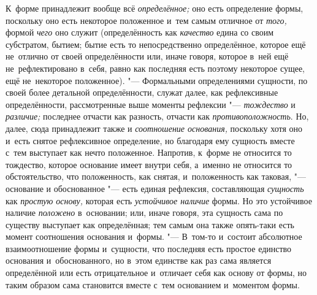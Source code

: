 К~форме принадлежит вообще всё {\em определённое;} оно есть определение формы,
поскольку оно есть некоторое положенное и~тем самым отличное от {\em того,}
формой {\em чего} оно служит (определённость как {\em качество} едина со своим
субстратом, бытием; бытие есть то непосредственно определённое, которое ещё
не~отлично от своей определённости или, иначе говоря, которое в~ней ещё
не~рефлектировано в~себя, равно как последняя есть поэтому некоторое сущее, ещё
не~некоторое положенное). "--- Формальными определениями сущности, по своей
более детальной определённости, служат далее, как рефлексивные определённости,
рассмотренные выше моменты рефлексии "--- {\em тождество} и {\em различие;}
последнее отчасти как разность, отчасти как {\em противоположность}. Но, далее,
сюда принадлежит также и {\em соотношение основания,} поскольку хотя оно и~есть
снятое рефлексивное определение, но благодаря ему сущность вместе с~тем
выступает как нечто положенное. Напротив, к~форме не относится то тождество,
которое основание имеет внутри себя, а~именно не относится то обстоятельство,
что положенность, как снятая, и~положенность как таковая, "--- основание и
обоснованное "--- есть единая рефлексия, составляющая {\em сущность} как
{\em простую основу,} которая есть {\em устойчивое наличие} формы. Но это
устойчивое наличие {\em положено} в~основании; или, иначе говоря, эта сущность
сама по существу выступает как определённая; тем самым она также опять-таки
есть момент соотношения основания и~формы. "--- В~том-то и~состоит абсолютное
взаимоотношение формы и~сущности, что последняя есть простое единство основания
и~обоснованного, но в~этом единстве как раз сама является определённой или есть
отрицательное и~отличает себя как основу от формы, но таким образом сама
становится вместе с~тем основанием и~моментом формы.

